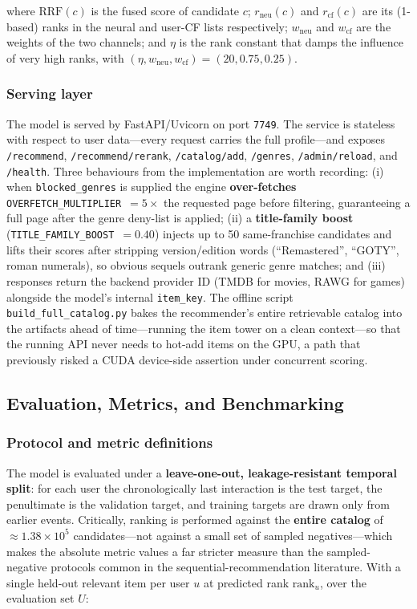 where $\mathrm{RRF}(c)$ is the fused score of candidate $c$; $r_{\text{neu}}(c)$ and $r_{\text{cf}}(c)$ are its (1-based) ranks in the neural and user-CF lists respectively; $w_{\text{neu}}$ and $w_{\text{cf}}$ are the weights of the two channels; and $\eta$ is the rank constant that damps the influence of very high ranks, with $(\eta, w_{\text{neu}}, w_{\text{cf}}) = (20, 0.75, 0.25)$.

\subsubsection{Serving layer}
The model is served by FastAPI/Uvicorn on port \texttt{7749}. The service is stateless with respect to user data---every request carries the full profile---and exposes \texttt{/recommend}, \texttt{/recommend/rerank}, \texttt{/catalog/add}, \texttt{/genres}, \texttt{/admin/reload}, and \texttt{/health}. Three behaviours from the implementation are worth recording: (i) when \texttt{blocked\_genres} is supplied the engine \textbf{over-fetches} \texttt{OVERFETCH\_MULTIPLIER}~$=5\times$ the requested page before filtering, guaranteeing a full page after the genre deny-list is applied; (ii) a \textbf{title-family boost} (\texttt{TITLE\_FAMILY\_BOOST}~$=0.40$) injects up to 50 same-franchise candidates and lifts their scores after stripping version/edition words (``Remastered'', ``GOTY'', roman numerals), so obvious sequels outrank generic genre matches; and (iii) responses return the backend provider ID (TMDB for movies, RAWG for games) alongside the model's internal \texttt{item\_key}. The offline script \texttt{build\_full\_catalog.py} bakes the recommender's entire retrievable catalog into the artifacts ahead of time---running the item tower on a clean context---so that the running API never needs to hot-add items on the GPU, a path that previously risked a CUDA device-side assertion under concurrent scoring.

\subsection{Evaluation, Metrics, and Benchmarking}
\label{sec:rec_eval}
\subsubsection{Protocol and metric definitions}
The model is evaluated under a \textbf{leave-one-out, leakage-resistant temporal split}: for each user the chronologically last interaction is the test target, the penultimate is the validation target, and training targets are drawn only from earlier events. Critically, ranking is performed against the \textbf{entire catalog} of $\approx 1.38\times10^{5}$ candidates---not against a small set of sampled negatives---which makes the absolute metric values a far stricter measure than the sampled-negative protocols common in the sequential-recommendation literature. With a single held-out relevant item per user $u$ at predicted rank $\mathrm{rank}_u$, over the evaluation set $U$:

